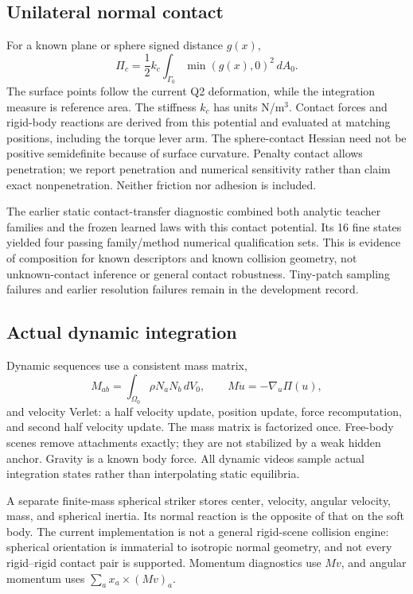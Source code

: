 \documentclass[10pt,twocolumn,letterpaper]{article}
\begin{document}
\subsection{Unilateral normal contact}
For a known plane or sphere signed distance $g(x)$,
\begin{equation}
 \Pi_c=\frac12 k_c\int_{\Gamma_0}\min(g(x),0)^2\,dA_0.
\end{equation}
The surface points follow the current Q2 deformation, while the integration measure is reference area. The stiffness $k_c$ has units N/m$^3$. Contact forces and rigid-body reactions are derived from this potential and evaluated at matching positions, including the torque lever arm. The sphere-contact Hessian need not be positive semidefinite because of surface curvature. Penalty contact allows penetration; we report penetration and numerical sensitivity rather than claim exact nonpenetration. Neither friction nor adhesion is included.

The earlier static contact-transfer diagnostic combined both analytic teacher families and the frozen learned laws with this contact potential. Its 16 fine states yielded four passing family/method numerical qualification sets. This is evidence of composition for known descriptors and known collision geometry, not unknown-contact inference or general contact robustness. Tiny-patch sampling failures and earlier resolution failures remain in the development record.

\subsection{Actual dynamic integration}
Dynamic sequences use a consistent mass matrix,
\begin{equation}
 M_{ab}=\int_{\Omega_0}\rho N_aN_b\,dV_0,\qquad M\ddot u=-\nabla_u\Pi(u),
\end{equation}
and velocity Verlet: a half velocity update, position update, force recomputation, and second half velocity update. The mass matrix is factorized once. Free-body scenes remove attachments exactly; they are not stabilized by a weak hidden anchor. Gravity is a known body force. All dynamic videos sample actual integration states rather than interpolating static equilibria.

A separate finite-mass spherical striker stores center, velocity, angular velocity, mass, and spherical inertia. Its normal reaction is the opposite of that on the soft body. The current implementation is not a general rigid-scene collision engine: spherical orientation is immaterial to isotropic normal geometry, and not every rigid--rigid contact pair is supported. Momentum diagnostics use $Mv$, and angular momentum uses $\sum_a x_a\times(Mv)_a$.
\end{document}
